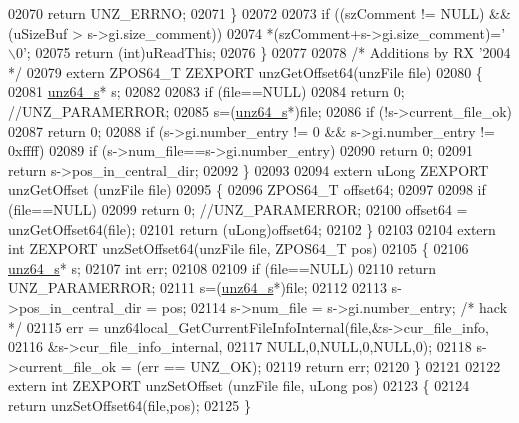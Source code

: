 \begin{DoxyCode}
02070         \textcolor{keywordflow}{return} UNZ\_ERRNO;
02071     \}
02072 
02073     \textcolor{keywordflow}{if} ((szComment != NULL) && (uSizeBuf > s->gi.size\_comment))
02074         *(szComment+s->gi.size\_comment)=\textcolor{charliteral}{'\(\backslash\)0'};
02075     \textcolor{keywordflow}{return} (\textcolor{keywordtype}{int})uReadThis;
02076 \}
02077 
02078 \textcolor{comment}{/* Additions by RX '2004 */}
02079 \textcolor{keyword}{extern} ZPOS64\_T ZEXPORT unzGetOffset64(unzFile file)
02080 \{
02081     \hyperlink{structunz64__s}{unz64\_s}* s;
02082 
02083     \textcolor{keywordflow}{if} (file==NULL)
02084           \textcolor{keywordflow}{return} 0; \textcolor{comment}{//UNZ\_PARAMERROR;}
02085     s=(\hyperlink{structunz64__s}{unz64\_s}*)file;
02086     \textcolor{keywordflow}{if} (!s->current\_file\_ok)
02087       \textcolor{keywordflow}{return} 0;
02088     \textcolor{keywordflow}{if} (s->gi.number\_entry != 0 && s->gi.number\_entry != 0xffff)
02089       \textcolor{keywordflow}{if} (s->num\_file==s->gi.number\_entry)
02090          \textcolor{keywordflow}{return} 0;
02091     \textcolor{keywordflow}{return} s->pos\_in\_central\_dir;
02092 \}
02093 
02094 \textcolor{keyword}{extern} uLong ZEXPORT unzGetOffset (unzFile file)
02095 \{
02096     ZPOS64\_T offset64;
02097 
02098     \textcolor{keywordflow}{if} (file==NULL)
02099           \textcolor{keywordflow}{return} 0; \textcolor{comment}{//UNZ\_PARAMERROR;}
02100     offset64 = unzGetOffset64(file);
02101     \textcolor{keywordflow}{return} (uLong)offset64;
02102 \}
02103 
02104 \textcolor{keyword}{extern} \textcolor{keywordtype}{int} ZEXPORT unzSetOffset64(unzFile file, ZPOS64\_T pos)
02105 \{
02106     \hyperlink{structunz64__s}{unz64\_s}* s;
02107     \textcolor{keywordtype}{int} err;
02108 
02109     \textcolor{keywordflow}{if} (file==NULL)
02110         \textcolor{keywordflow}{return} UNZ\_PARAMERROR;
02111     s=(\hyperlink{structunz64__s}{unz64\_s}*)file;
02112 
02113     s->pos\_in\_central\_dir = pos;
02114     s->num\_file = s->gi.number\_entry;      \textcolor{comment}{/* hack */}
02115     err = unz64local\_GetCurrentFileInfoInternal(file,&s->cur\_file\_info,
02116                                               &s->cur\_file\_info\_internal,
02117                                               NULL,0,NULL,0,NULL,0);
02118     s->current\_file\_ok = (err == UNZ\_OK);
02119     \textcolor{keywordflow}{return} err;
02120 \}
02121 
02122 \textcolor{keyword}{extern} \textcolor{keywordtype}{int} ZEXPORT unzSetOffset (unzFile file, uLong pos)
02123 \{
02124     \textcolor{keywordflow}{return} unzSetOffset64(file,pos);
02125 \}
\end{DoxyCode}
